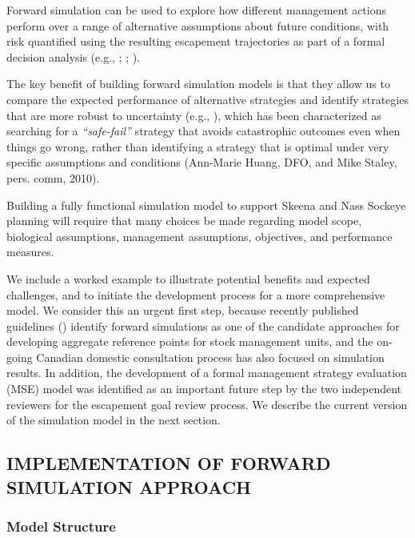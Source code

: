 \documentclass[french,11pt]{book}
\begin{document}
Forward simulation can be used to explore how different management actions perform over a range of alternative assumptions about future conditions, with risk quantified using the resulting escapement trajectories as part of a formal decision analysis (e.g., ; ; ).

The key benefit of building forward simulation models is that they allow us to compare the expected performance of alternative strategies and identify strategies that are more robust to uncertainty (e.g., ), which has been characterized as searching for a \emph{``safe-fail''} strategy that avoids catastrophic outcomes even when things go wrong, rather than identifying a strategy that is optimal under very specific assumptions and conditions (Ann-Marie Huang, DFO, and Mike Staley, pers. comm, 2010).

Building a fully functional simulation model to support Skeena and Nass Sockeye planning will require that many choices be made regarding model scope, biological assumptions, management assumptions, objectives, and performance measures.

We include a worked example to illustrate potential benefits and expected challenges, and to initiate the development process for a more comprehensive model. We consider this an urgent first step, because recently published guidelines () identify forward simulations as one of the candidate approaches for developing aggregate reference points for stock management units, and the on-going Canadian domestic consultation process has also focused on simulation results. In addition, the development of a formal management strategy evaluation (MSE) model was identified as an important future step by the two independent reviewers for the escapement goal review process. We describe the current version of the simulation model in the next section.

\subsection{IMPLEMENTATION OF FORWARD SIMULATION APPROACH}\label{SimMethodsImplementation}

\subsubsection{Model Structure}\label{model-structure}
\end{document}
